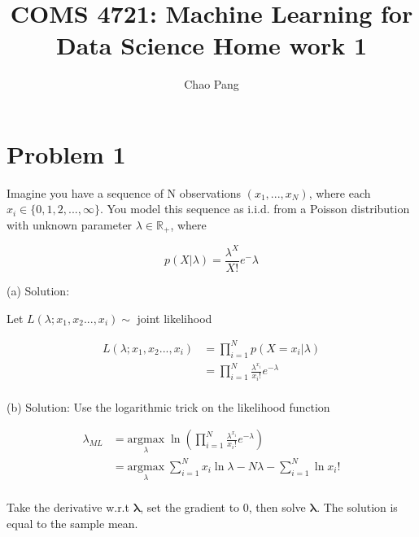 \documentclass[11pt]{report}
\begin{document}
\title{COMS 4721: Machine Learning for Data Science 
Home work 1}
\author{Chao Pang}
 
\maketitle

\section{Problem 1}
Imagine you have a sequence of N observations $(x_1,...,x_N)$, where each $x_i \in \{0,1,2,...,\infty\}$. You
model this sequence as i.i.d. from a Poisson distribution with unknown parameter $\lambda \in \mathbb{R}_+$, where

\[ p(X|\lambda) = \frac{ \lambda^X}{X!}e^-\lambda \]

\begin{flushleft}
(a) Solution: 
\end{flushleft}

\begin{center}
Let $L(\lambda; x_1, x_2 ..., x_i)  \sim$ joint likelihood
\end{center}

\begin{equation*}
\begin{split}
L(\lambda; x_1, x_2 ..., x_i)  & = \prod_{i=1}^N p(X=x_i| \lambda) \\
&  = \prod_{i=1}^N\frac{\lambda^{x_i}}{x_i!} e^{-\lambda} \\
\end{split}
\end{equation*}


\begin{flushleft}
(b) Solution: 
Use the logarithmic trick on the likelihood function
\end{flushleft}

\begin{equation*}
\begin{split}
\lambda_{ML} & = \underset{\lambda}{\mathrm{argmax}} \; \ln{(\prod_{i=1}^N\frac{\lambda^{x_i}}{x_i!} e^{-\lambda})} \\
& = \underset{\lambda}{\mathrm{argmax}} \; {\sum_{i=1}^N{x_i}\ln{\lambda} }  - {N\lambda}  -  {\sum_{i=1}^N\ln{x_i!}}\\
\end{split}
\end{equation*}

\begin{flushleft}
Take the derivative w.r.t $\boldsymbol{\lambda}$, set the gradient to 0, then solve $\boldsymbol{\lambda}$. The solution is equal to the sample mean. 
\end{flushleft}
\end{document}
